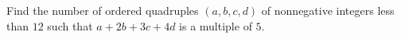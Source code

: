 Find the number of ordered quadruples $(a,b,c,d)$ of nonnegative integers less than $12$ such that $a +2b +3c +4d$ is a multiple of $5$.
